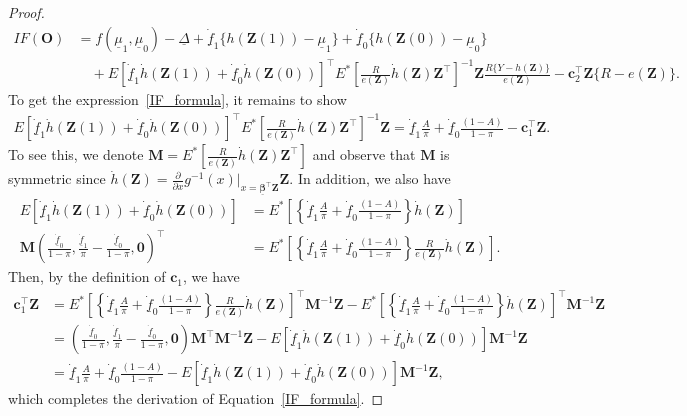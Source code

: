 \documentclass[12pt]{article}
\newcommand{\bO}{\boldsymbol{O}}
\newcommand{\bZ}{\boldsymbol{Z}}
\newcommand{\bzero}{\boldsymbol{0}}
\newcommand{\bbeta}{\boldsymbol{\beta}}
\begin{document}
\begin{proof}
\begin{align*}
    IF(\bO)&=  f(\underline{\mu}_1,\underline{\mu}_0) - \underline{\Delta} + \dot{\underline{f}}_1\{h(\bZ(1)) - \underline{\mu}_1\} + \dot{\underline{f}}_0\{h(\bZ(0)) - \underline{\mu}_0\}\\
    &\quad + E[\dot{\underline{f}}_1\dot{h}(\bZ(1)) + \dot{\underline{f}}_0\dot{h}(\bZ(0))]^\top E^*\left[\frac{R}{e(\bZ)}\dot{h}(\bZ)\bZ^\top\right]^{-1} \bZ  \frac{R\{Y-h(\bZ)\}}{ e(\bZ)} - \boldsymbol{c}_2^\top \bZ \{R - e(\bZ)\}.
\end{align*}
To get the expression~\eqref{IF_formula}, it remains to show
\begin{align*}
    E[\dot{\underline{f}}_1\dot{h}(\bZ(1)) + \dot{\underline{f}}_0\dot{h}(\bZ(0))]^\top E^*\left[\frac{R}{e(\bZ)}\dot{h}(\bZ)\bZ^\top\right]^{-1} \bZ = \dot{\underline{f}}_1\frac{A}{\pi} + \dot{\underline{f}}_0\frac{(1-A)}{1-\pi} - \boldsymbol{c}_1^\top \bZ.
\end{align*}
To see this, we denote $\mathbf{M} = E^*\left[\frac{R}{e(\bZ)}\dot{h}(\bZ)\bZ^\top\right]$ and observe that $\mathbf{M}$ is symmetric since $\dot{h}(\bZ) = \frac{\partial}{\partial x} g^{-1}(x)\big|_{x=\underline{\bbeta}^\top \bZ} \bZ$. In addition, we also have
\begin{align*}
    E[\dot{\underline{f}}_1\dot{h}(\bZ(1)) + \dot{\underline{f}}_0\dot{h}(\bZ(0))] &= E^*\left[\left\{\dot{\underline{f}}_1\frac{A}{\pi} + \dot{\underline{f}}_0\frac{(1-A)}{1-\pi}\right\} \dot{h}(\bZ)\right] \\
    \mathbf{M} \left(\frac{\dot{\underline{f}}_0}{1-\pi}, \frac{\dot{\underline{f}}_1}{\pi}-\frac{\dot{\underline{f}}_0}{1-\pi}, \bzero\right)^\top &= E^*\left[\left\{\dot{\underline{f}}_1\frac{A}{\pi} + \dot{\underline{f}}_0\frac{(1-A)}{1-\pi}\right\} \frac{R}{e(\bZ)}\dot{h}(\bZ)\right].
\end{align*}
Then, by the definition of $\boldsymbol{c}_1$, we have
\begin{align*}
    \boldsymbol{c}_1^\top \bZ &=E^*\left[\left\{\dot{\underline{f}}_1\frac{A}{\pi} + \dot{\underline{f}}_0\frac{(1-A)}{1-\pi}\right\}\frac{R}{e(\bZ)} \dot{h}(\bZ)\right]^\top \mathbf{M}^{-1} \bZ - E^*\left[\left\{\dot{\underline{f}}_1\frac{A}{\pi} + \dot{\underline{f}}_0\frac{(1-A)}{1-\pi}\right\} \dot{h}(\bZ)\right]^\top  \mathbf{M}^{-1} \bZ \\
    &= \left(\frac{\dot{\underline{f}}_0}{1-\pi}, \frac{\dot{\underline{f}}_1}{\pi}-\frac{\dot{\underline{f}}_0}{1-\pi}, \bzero\right) \mathbf{M}^\top \mathbf{M}^{-1} \bZ - E[\dot{\underline{f}}_1\dot{h}(\bZ(1)) + \dot{\underline{f}}_0\dot{h}(\bZ(0))]\mathbf{M}^{-1} \bZ \\
    &= \dot{\underline{f}}_1\frac{A}{\pi} + \dot{\underline{f}}_0\frac{(1-A)}{1-\pi} - E[\dot{\underline{f}}_1\dot{h}(\bZ(1)) + \dot{\underline{f}}_0\dot{h}(\bZ(0))]\mathbf{M}^{-1} \bZ,
\end{align*}
which completes the derivation of Equation~\eqref{IF_formula}.


\end{proof}
\end{document}
